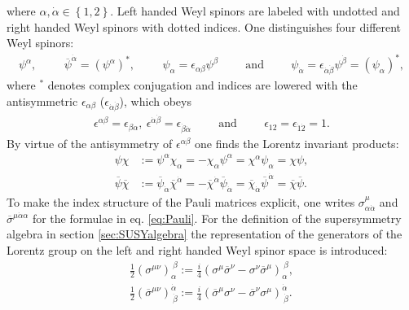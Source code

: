 where $\alpha,\dot{\alpha} \in \left\{ 1,2 \right\}$. Left handed Weyl spinors are labeled with undotted and right handed Weyl spinors with dotted indices. One distinguishes four different Weyl spinors:
\begin{align}
\psi^\alpha, \hspace{1cm} 
\overline{\psi}^{\dot{\alpha}} = (\psi^\alpha)^\ast, \hspace{1cm} \psi_\alpha = \epsilon_{\alpha\beta}\psi^\beta \hspace{1cm} \mathrm{and} \hspace{1cm} \psi_{\dot{\alpha}} = \epsilon_{\dot{\alpha}\dot{\beta}}\psi^{\dot{\beta}} = (\psi_\alpha)^\ast,
\end{align}
where $^\ast$ denotes complex conjugation and indices are lowered with the antisymmetric $\epsilon_{\alpha\beta}$ ($\epsilon_{\dot{\alpha}\dot{\beta}}$), which obeys
\begin{align}
\epsilon^{\alpha\beta} = \epsilon_{\beta\alpha},\ \epsilon^{\dot{\alpha}\dot{\beta}} = \epsilon_{\dot{\beta}\dot{\alpha}} \hspace{1cm} \mathrm{and} \hspace{1cm} \epsilon_{12} = \epsilon_{\dot{1}\dot{2}}= 1.
\end{align}
By virtue of the antisymmetry of $\epsilon^{\alpha \beta}$ one finds the Lorentz invariant products:
\begin{align}
\psi\chi &:= \psi^\alpha\chi_\alpha = -\chi_\alpha\psi^\alpha = \chi^\alpha\psi_\alpha = \chi\psi,\nonumber\\
\overline{\psi}\overline{\chi} &:= \overline{\psi}_{\dot{\alpha}} \overline{\chi}^{\dot{\alpha}} = -\overline{\chi}^{\dot{\alpha}}\overline{\psi}_{\dot{\alpha}} = \overline{\chi}_{\dot{\alpha}}\overline{\psi}^{\dot{\alpha}} = \overline{\chi}\overline{\psi}. \label{eq:Weylspinorproduct}
\end{align}
To make the index structure of the Pauli matrices explicit, one writes $\sigma^\mu_{\alpha\dot{\alpha}}$ and $\overline{\sigma}^{\mu\dot{\alpha}\alpha}$ for the formulae in eq. \eqref{eq:Pauli}. For the definition of the supersymmetry algebra in section \ref{sec:SUSYalgebra} the representation of the generators of the Lorentz group on the left and right handed Weyl spinor space is introduced:
\begin{align}
\frac{1}{2}(\sigma^{\mu\nu})_\alpha^{\ \beta} := \frac{i}{4}(\sigma^\mu\overline{\sigma}^\nu - \sigma^\nu\overline{\sigma}^\mu)_\alpha^{\ \beta},\nonumber\\
\frac{1}{2}(\overline{\sigma}^{\mu\nu})^{\dot{\alpha}}_{\ \dot{\beta}} := \frac{i}{4}(\overline{\sigma}^\mu\sigma^\nu - \overline{\sigma}^\nu\sigma^\mu)^{\dot{\alpha}}_{\ \dot{\beta}}.
\end{align}

